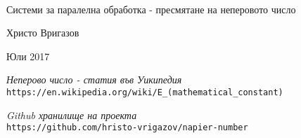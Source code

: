 \documentclass[oneside,11pt,a4paper,oldfontcommands]{memoir}
\begin{document}
%
%
\thispagestyle{empty}

{%
\sffamily
\centering
\Large

~\vspace{\fill}

{\huge 
Системи за паралелна обработка - пресмятане на неперовото число
}

\vspace{2.5cm}

{\LARGE
Христо Вригазов
}

\vspace{3.5cm}



\vspace{\fill}

Юли 2017

}%

\clearpage

\renewcommand*\contentsname{Съдържание}

\tableofcontents*

\clearpage




\begin{thebibliography}{9}

\textit{Неперово число - статия във Уикипедия}
\\\texttt{https://en.wikipedia.org/wiki/E\_(mathematical\_constant)}

\textit{Github хранилище на проекта}
\\\texttt{https://github.com/hristo-vrigazov/napier-number}


\end{thebibliography}
\end{document}
